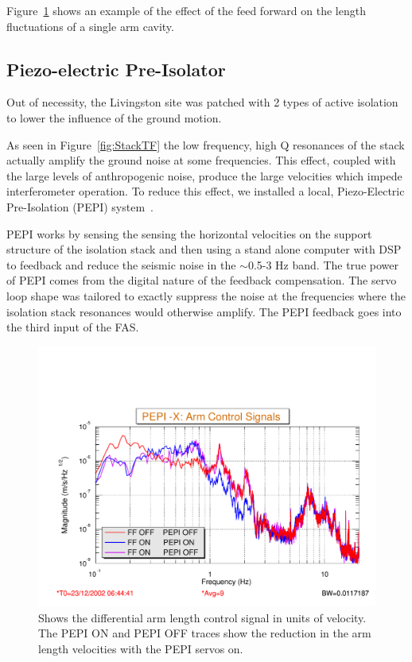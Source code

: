 Figure~\ref{fig:PEPI} shows an example of the effect of the feed forward on
the length fluctuations of a single arm cavity.

\subsection{Piezo-electric Pre-Isolator}

Out of necessity, the Livingston site was patched with 2 types of active
isolation to lower the influence of the ground motion.

As seen in Figure~\ref{fig:StackTF} the low frequency, high Q resonances of the
stack actually amplify the ground noise at some frequencies. This effect,
coupled with the large levels of anthropogenic noise, produce the large velocities
which impede interferometer operation. To reduce this effect, we installed a
local, Piezo-Electric Pre-Isolation (PEPI) system~\cite{Giaime:PEPI}.

PEPI works by sensing the sensing the horizontal velocities on the support
structure of the isolation stack and then using a stand alone computer with DSP
to feedback and reduce the seismic noise in the $\sim$0.5-3 Hz band. The
true power of PEPI comes from the digital nature of the feedback compensation.
The servo loop shape was tailored to exactly suppress the noise at the frequencies
where the isolation stack resonances would otherwise amplify. The PEPI feedback
goes into the third input of the FAS.

\begin{figure}[!h]
\centerline{
\includegraphics[angle=0,width=6.5in]{Figures/Chap5/PEPI-onoff.pdf}}
\caption[PEPI Performance]{Shows the differential arm length control signal
                   in units of velocity. The PEPI ON and PEPI OFF traces
                   show the reduction in the arm length velocities with
                   the PEPI servos on.}
\label{fig:PEPI}
\end{figure}



